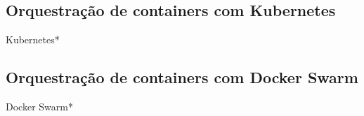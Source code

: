 






\subsection{Orquestração de containers com Kubernetes}
Kubernetes*

\subsection{Orquestração de containers com Docker Swarm}
Docker Swarm*

